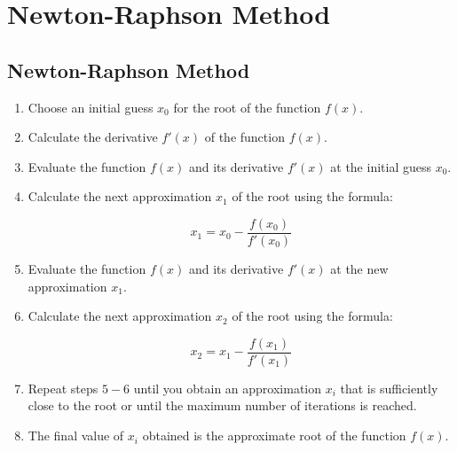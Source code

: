 \newpage
\chapter{Newton-Raphson Method}


\section{Newton-Raphson Method}

\begin{enumerate}
\item Choose an initial guess $x_0$ for the root of the function $f(x)$.

\item Calculate the derivative $f'(x)$ of the function $f(x)$.

\item Evaluate the function $f(x)$ and its derivative $f'(x)$ at the initial guess $x_0$.

\item Calculate the next approximation $x_1$ of the root using the formula:

\begin{equation}
  x_1 = x_0 - \frac{f(x_0)}{f'(x_0)}
\end{equation}


\item Evaluate the function $f(x)$ and its derivative $f'(x)$ at the new approximation $x_1$.

\item Calculate the next approximation $x_2$ of the root using the formula:

\begin{equation}
    x_2 = x_1 - \frac{f(x_1)}{f'(x_1)}
\end{equation}

\item Repeat steps $5-6$ until you obtain an approximation $x_i$ that is sufficiently close to the root or until the maximum number of iterations is reached.

\item The final value of $x_i$ obtained is the approximate root of the function $f(x)$.


\end{enumerate}
